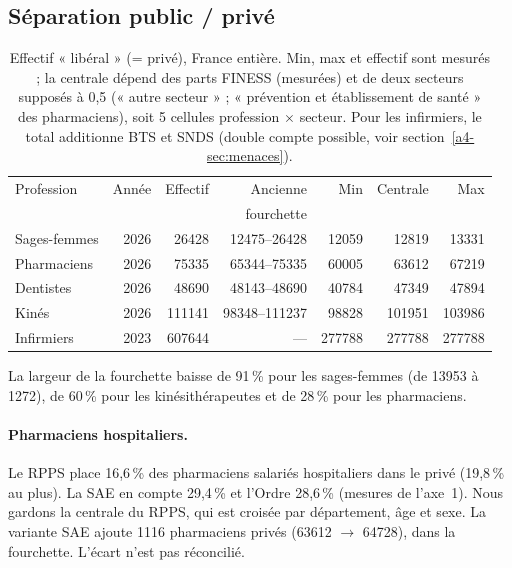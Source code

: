 \subsection{Séparation public / privé}\label{a4-sec:res-secteur}
\begin{table}[h]
\centering\small
\setlength{\tabcolsep}{4pt}
\begin{tabular}{@{}lrrrrrr@{}}
\toprule
Profession & Année & Effectif & Ancienne & Min & Centrale & Max \\
 & & & fourchette & & & \\
\midrule
Sages-femmes & 2026 & \num{26428} & \num{12475}--\num{26428} & \num{12059} & \num{12819} & \num{13331} \\
Pharmaciens  & 2026 & \num{75335} & \num{65344}--\num{75335} & \num{60005} & \num{63612} & \num{67219} \\
Dentistes    & 2026 & \num{48690} & \num{48143}--\num{48690} & \num{40784} & \num{47349} & \num{47894} \\
Kinés        & 2026 & \num{111141} & \num{98348}--\num{111237} & \num{98828} & \num{101951} & \num{103986} \\
Infirmiers   & 2023 & \num{607644} & --- & \num{277788} & \num{277788} & \num{277788} \\
\bottomrule
\end{tabular}
\caption{Effectif « libéral » (= privé), France entière. Min, max et effectif sont mesurés\mesure{} ; la centrale
dépend des parts FINESS (mesurées\mesure{}) et de deux secteurs supposés à 0,5\suppose{} (« autre secteur » ; « prévention et établissement de santé » des pharmaciens), soit 5 cellules profession $\times$ secteur. Pour les infirmiers, le
total additionne BTS et SNDS (double compte possible, voir section~\ref{a4-sec:menaces}).}
\label{a4-tab:fourchettes}
\end{table}

La largeur de la fourchette baisse de 91\,\% pour les sages-femmes (de \num{13953} à \num{1272}), de 60\,\% pour
les kinésithérapeutes et de 28\,\% pour les pharmaciens\derive{}.

\paragraph{Pharmaciens hospitaliers.} Le RPPS place 16,6\,\% des pharmaciens salariés hospitaliers dans le privé
(19,8\,\% au plus)\mesure{}. La SAE en compte 29,4\,\% et l'Ordre 28,6\,\% (mesures de l'axe~1). Nous gardons
la centrale du RPPS, qui est croisée par département, âge et sexe. La variante SAE ajoute \num{1116} pharmaciens
privés\derive{} (\num{63612} $\rightarrow$ \num{64728}), dans la fourchette. L'écart n'est pas réconcilié.

